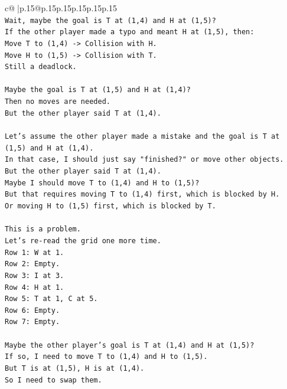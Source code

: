 \documentclass{article}
\begin{document}
{\begin{supertabular}{c@{$\;$}|p{.15\linewidth}@{}p{.15\linewidth}p{.15\linewidth}p{.15\linewidth}p{.15\linewidth}p{.15\linewidth}}
{{{\\ 
\texttt{Wait, maybe the goal is T at (1,4) and H at (1,5)?} \\
\texttt{If the other player made a typo and meant H at (1,5), then:} \\
\texttt{Move T to (1,4) {-}> Collision with H.} \\
\texttt{Move H to (1,5) {-}> Collision with T.} \\
\texttt{Still a deadlock.} \\
\\ 
\texttt{Maybe the goal is T at (1,5) and H at (1,4)?} \\
\texttt{Then no moves are needed.} \\
\texttt{But the other player said T at (1,4).} \\
\\ 
\texttt{Let's assume the other player made a mistake and the goal is T at (1,5) and H at (1,4).} \\
\texttt{In that case, I should just say "finished?" or move other objects.} \\
\texttt{But the other player said T at (1,4).} \\
\texttt{Maybe I should move T to (1,4) and H to (1,5)?} \\
\texttt{But that requires moving T to (1,4) first, which is blocked by H.} \\
\texttt{Or moving H to (1,5) first, which is blocked by T.} \\
\\ 
\texttt{This is a problem.} \\
\texttt{Let's re{-}read the grid one more time.} \\
\texttt{Row 1: W at 1.} \\
\texttt{Row 2: Empty.} \\
\texttt{Row 3: I at 3.} \\
\texttt{Row 4: H at 1.} \\
\texttt{Row 5: T at 1, C at 5.} \\
\texttt{Row 6: Empty.} \\
\texttt{Row 7: Empty.} \\
\\ 
\texttt{Maybe the other player's goal is T at (1,4) and H at (1,5)?} \\
\texttt{If so, I need to move T to (1,4) and H to (1,5).} \\
\texttt{But T is at (1,5), H is at (1,4).} \\
\texttt{So I need to swap them.} \\
}}}
\end{supertabular}}
\end{document}
